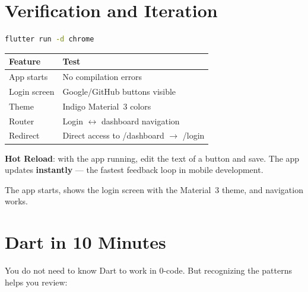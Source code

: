 \section{Verification and Iteration}

\begin{praticabox}[title={Hands-on --- Start the app}]
\begin{lstlisting}[language=bash]
flutter run -d chrome
\end{lstlisting}
\end{praticabox}

\begin{center}
\begin{tabularx}{\textwidth}{l X}
\toprule
\textbf{Feature} & \textbf{Test} \\
\midrule
App starts & No compilation errors \\
Login screen & Google/GitHub buttons visible \\
Theme & Indigo Material~3 colors \\
Router & Login $\leftrightarrow$ dashboard navigation \\
Redirect & Direct access to /dashboard $\rightarrow$ /login \\
\bottomrule
\end{tabularx}
\end{center}

\textbf{Hot Reload}: with the app running, edit the text of a button and save. The app updates \textbf{instantly} --- the fastest feedback loop in mobile development.

\begin{checkpointbox}
The app starts, shows the login screen with the Material~3 theme, and navigation works.
\end{checkpointbox}

\section{Dart in 10 Minutes}

You do not need to know Dart to work in 0-code. But recognizing the patterns helps you review:

